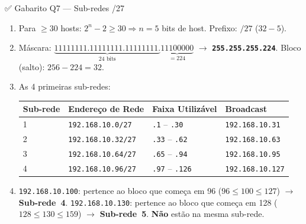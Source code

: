 \documentclass[11pt,a4paper]{article}
\begin{document}
\begin{gabaritocaixa}{✅ Gabarito Q7 --- Sub-redes /27}
\begin{enumerate}[label=(\alph*)]
    \item Para $\geq 30$ hosts: $2^n - 2 \geq 30 \Rightarrow n = 5$ bits de host. Prefixo: $/27$ ($32-5$).
    \item Máscara: $\underbrace{11111111.11111111.11111111.}_{24\text{ bits}}\underbrace{11100000}_{= 224}$ $\to$ \textbf{\texttt{255.255.255.224}}. Bloco (salto): $256 - 224 = 32$.
    \item As 4 primeiras sub-redes:
\begin{center}
\begin{tabular}{llll}
\toprule
\textbf{Sub-rede} & \textbf{Endereço de Rede} & \textbf{Faixa Utilizável} & \textbf{Broadcast} \\
\midrule
1 & \texttt{192.168.10.0/27} & \texttt{.1} -- \texttt{.30} & \texttt{192.168.10.31} \\
2 & \texttt{192.168.10.32/27} & \texttt{.33} -- \texttt{.62} & \texttt{192.168.10.63} \\
3 & \texttt{192.168.10.64/27} & \texttt{.65} -- \texttt{.94} & \texttt{192.168.10.95} \\
4 & \texttt{192.168.10.96/27} & \texttt{.97} -- \texttt{.126} & \texttt{192.168.10.127} \\
\bottomrule
\end{tabular}
\end{center}
    \item \texttt{192.168.10.100}: pertence ao bloco que começa em 96 ($96 \leq 100 \leq 127$) $\to$ \textbf{Sub-rede~4}. \texttt{192.168.10.130}: pertence ao bloco que começa em 128 ($128 \leq 130 \leq 159$) $\to$ \textbf{Sub-rede~5}. \textbf{Não} estão na mesma sub-rede.
\end{enumerate}
\end{gabaritocaixa}
\end{document}
